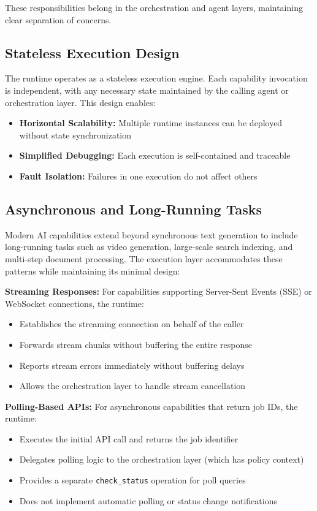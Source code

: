 These responsibilities belong in the orchestration and agent layers, maintaining clear separation of concerns.

\subsection{Stateless Execution Design}

The runtime operates as a stateless execution engine. Each capability invocation is independent, with any necessary state maintained by the calling agent or orchestration layer. This design enables:
\begin{itemize}
    \item \textbf{Horizontal Scalability:} Multiple runtime instances can be deployed without state synchronization
    \item \textbf{Simplified Debugging:} Each execution is self-contained and traceable
    \item \textbf{Fault Isolation:} Failures in one execution do not affect others
\end{itemize}

\subsection{Asynchronous and Long-Running Tasks}

Modern AI capabilities extend beyond synchronous text generation to include long-running tasks such as video generation, large-scale search indexing, and multi-step document processing. The execution layer accommodates these patterns while maintaining its minimal design:

\textbf{Streaming Responses:} For capabilities supporting Server-Sent Events (SSE) or WebSocket connections, the runtime:
\begin{itemize}
    \item Establishes the streaming connection on behalf of the caller
    \item Forwards stream chunks without buffering the entire response
    \item Reports stream errors immediately without buffering delays
    \item Allows the orchestration layer to handle stream cancellation
\end{itemize}

\textbf{Polling-Based APIs:} For asynchronous capabilities that return job IDs, the runtime:
\begin{itemize}
    \item Executes the initial API call and returns the job identifier
    \item Delegates polling logic to the orchestration layer (which has policy context)
    \item Provides a separate \texttt{check\_status} operation for poll queries
    \item Does not implement automatic polling or status change notifications
\end{itemize}

